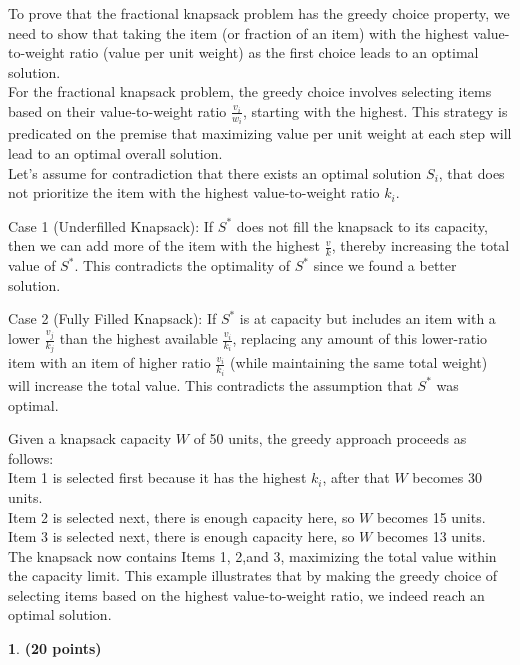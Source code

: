 \documentclass[11pt]{article}
\theoremstyle{definition}
\newtheorem{prob}{}
\begin{document}
To prove that the fractional knapsack problem has the greedy choice property, we need to show that taking the item 
(or fraction of an item) with the highest value-to-weight ratio (value per unit weight) as the first choice leads to an optimal solution. \\

For the fractional knapsack problem, the greedy choice involves selecting items based on their value-to-weight ratio $\frac{v_i}{w_i}$,
starting with the highest. This strategy is predicated on the premise that maximizing value per unit weight at each step will lead to an optimal overall solution. \\

Let's assume for contradiction that there exists an optimal solution $S_i$, that does not prioritize the item with the highest value-to-weight ratio $k_i$.

Case 1 (Underfilled Knapsack): If $S^*$ does not fill the knapsack to its capacity, then we can add more of the item with the highest $\frac{v}{k}$, thereby increasing the total value of $S^*$. This contradicts the optimality of $S^*$ since we found a better solution.

Case 2 (Fully Filled Knapsack): If $S^*$ is at capacity but includes an item with a lower $\frac{v_j}{k_j}$ than the highest available $\frac{v_i}{k_i}$, replacing any amount of this lower-ratio item with an item of higher ratio $\frac{v_i}{k_i}$ (while maintaining the same total weight) will increase the total value. This contradicts the assumption that $S^*$ was optimal.

Given a knapsack capacity $W$ of 50 units, the greedy approach proceeds as follows: \\

Item 1 is selected first because it has the highest $k_i$, after that $W$ becomes 30 units. \\
Item 2 is selected next, there is enough capacity here, so $W$ becomes 15 units. \\
Item 3 is selected next, there is enough capacity here, so $W$ becomes 13 units. \\

The knapsack now contains Items 1, 2,and 3, maximizing the total value within the capacity limit. This example illustrates that by making the greedy choice of selecting items based on the highest value-to-weight ratio, we indeed reach an optimal solution.

\begin{prob} \textbf{(20 points)}
\end{prob}
\end{document}
